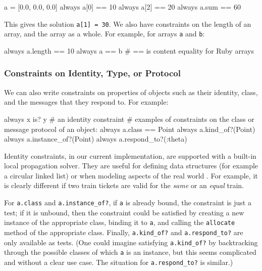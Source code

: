 \begin{code}
a = [0.0, 0.0, 0.0]
always { a[0] == 10 }
always { a[2] == 20 }
always { a.sum == 60 }
\end{code}

This gives the solution \lstinline{a[1] = 30}.
We also have constraints on the length of an array, and the array as a
whole.  For example, for arrays \lstinline{a} and \lstinline{b}:

\begin{code}
always { a.length == 10 }
always { a == b } # == is content equality for Ruby arrays
\end{code}


\subsubsection{Constraints on Identity, Type, or Protocol}
We can also write constraints on properties of objects such as their
identity, class, and the messages that they respond to.  For example:

\begin{code}
always { x is? y  } # an identity constraint
# examples of constraints on the class or message protocol of an object:
always { a.class == Point }
always { a.kind_of?(Point) }
always { a.instance_of?(Point) }
always { a.respond_to?(:theta) }
\end{code}

Identity constraints, in our current implementation, are supported
with a built-in local propagation solver. They are useful for defining
data structures (for example a circular linked list) or when modeling
aspects of the real world \cite{lopez-ecoop-1994}. For example, it is
clearly different if two train tickets are valid for the \emph{same}
or an \emph{equal} train.

For \lstinline{a.class} and \lstinline{a.instance_of?}, if
\lstinline{a} is already bound, the constraint is just a test; if it
is unbound, then the constraint could be satisfied by creating a new
instance of the appropriate class, binding it to \lstinline{a}, and
calling the \lstinline{allocate} method of the appropriate class.
Finally, \lstinline{a.kind_of?}  and \lstinline{a.respond_to?} are
only available as tests.  (One could imagine satisfying
\lstinline{a.kind_of?} by backtracking through the possible classes of
which \lstinline{a} is an instance, but this seems complicated and
without a clear use case.  The situation for \lstinline{a.respond_to?}
is similar.)

